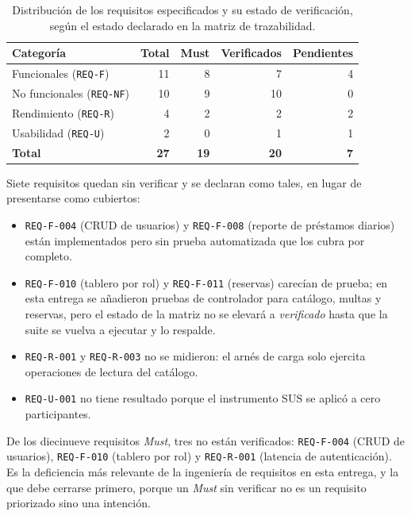 \documentclass[11pt,a4paper]{article}
\newcommand{\req}[1]{\texttt{#1}}
\begin{document}
\begin{table}[htbp]
\centering
\small
\begin{tabular}{@{}lrrrr@{}}
\toprule
\textbf{Categoría} & \textbf{Total} & \textbf{Must} & \textbf{Verificados} & \textbf{Pendientes} \\
\midrule
Funcionales (\req{REQ-F})     & 11 & 8 & 7 & 4 \\
No funcionales (\req{REQ-NF}) & 10 & 9 & 10 & 0 \\
Rendimiento (\req{REQ-R})     & 4 & 2 & 2 & 2 \\
Usabilidad (\req{REQ-U})      & 2 & 0 & 1 & 1 \\
\midrule
\textbf{Total}                & \textbf{27} & \textbf{19} & \textbf{20} & \textbf{7} \\
\bottomrule
\end{tabular}
\caption{Distribución de los requisitos especificados y su estado de
verificación, según el estado declarado en la matriz de trazabilidad.}
\label{tab:requisitos}
\end{table}

Siete requisitos quedan sin verificar y se declaran como tales, en lugar de
presentarse como cubiertos:

\begin{itemize}[leftmargin=*]
  \item \req{REQ-F-004} (CRUD de usuarios) y \req{REQ-F-008} (reporte de
        préstamos diarios) están implementados pero sin prueba automatizada que
        los cubra por completo.
  \item \req{REQ-F-010} (tablero por rol) y \req{REQ-F-011} (reservas) carecían
        de prueba; en esta entrega se añadieron pruebas de controlador para
        catálogo, multas y reservas, pero el estado de la matriz no se elevará a
        \emph{verificado} hasta que la suite se vuelva a ejecutar y lo respalde.
  \item \req{REQ-R-001} y \req{REQ-R-003} no se midieron: el arnés de carga solo
        ejercita operaciones de lectura del catálogo.
  \item \req{REQ-U-001} no tiene resultado porque el instrumento SUS se aplicó a
        cero participantes.
\end{itemize}

De los diecinueve requisitos \emph{Must}, tres no están verificados:
\req{REQ-F-004} (CRUD de usuarios), \req{REQ-F-010} (tablero por rol) y
\req{REQ-R-001} (latencia de autenticación). Es la deficiencia más relevante de
la ingeniería de requisitos en esta entrega, y la que debe cerrarse primero,
porque un \emph{Must} sin verificar no es un requisito priorizado sino una
intención.
\end{document}
